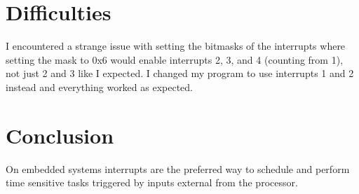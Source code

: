 \documentclass[12pt,letterpaper]{article}
\begin{document}
\section{Difficulties}
I encountered a strange issue with setting the bitmasks of the interrupts where setting the mask to 0x6 would enable interrupts 2, 3, and 4 (counting from 1), not just 2 and 3 like I expected. I changed my program to use interrupts 1 and 2 instead and everything worked as expected.

\section{Conclusion}
On embedded systems interrupts are the preferred way to schedule and perform time sensitive tasks triggered by inputs external from the processor.
\end{document}
